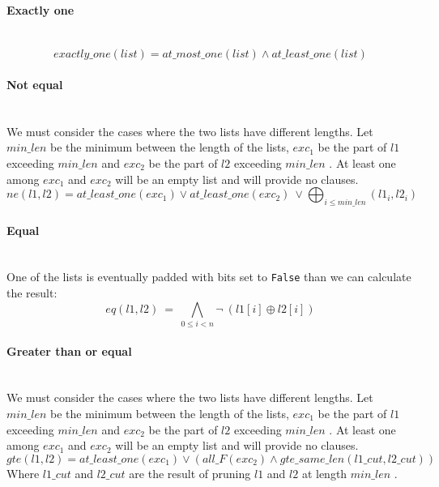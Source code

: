   \paragraph*{Exactly one} \hfill \\
    \begin{equation}
      exactly\_one(list) = at\_most\_one(list) \land at\_least\_one(list)
    \end{equation}

  \paragraph*{Not equal} \hfill \\
  We must consider the cases where the two lists have different lengths.
  Let \(min\_len\)  be the minimum between the length of the lists, \(exc_1\)  be the part of \(l1\) 
  exceeding \(min\_len\)  and \(exc_2\)  be the part of \(l2\)  exceeding \(min\_len\) . At least one 
  among \(exc_1\)  and \(exc_2\)  will be an empty list and will provide no clauses.\\
  \begin{equation}
    ne(l1, l2) = at\_least\_one(exc_1) \lor at\_least\_one(exc_2)\ \lor \bigoplus_{i \leq min\_len}(l1_i, l2_i)
  \end{equation}

  \paragraph*{Equal} \hfill \\
    One of the lists is eventually padded with bits set to \texttt{False} than we can
    calculate the result:
    \begin{equation}
      eq(l1, l2)\ =\ \bigwedge_{0 \leq i < n} \neg\ (l1[i] \oplus l2[i])
    \end{equation}

  \paragraph*{Greater than or equal} \hfill \\
    We must consider the cases where the two lists have different lengths.
    Let \(min\_len\)  be the minimum between the length of the lists, \(exc_1\)  be the part of \(l1\)  
    exceeding \(min\_len\)  and \(exc_2\)  be the part of \(l2\)  exceeding \(min\_len\) . At least one among
    \(exc_1\)  and \(exc_2\)  will be an empty list and will provide no clauses.\\
    \begin{equation}
          gte(l1, l2) = at\_least\_one(exc_1) \lor ( all\_F(exc_2) \land gte\_same\_len(l1\_cut, l2\_cut))
    \end{equation}
    Where \(l1\_cut\)  and \(l2\_cut\)  are the result of pruning \(l1\)  and \(l2\)  at length \(min\_len\) .\\

